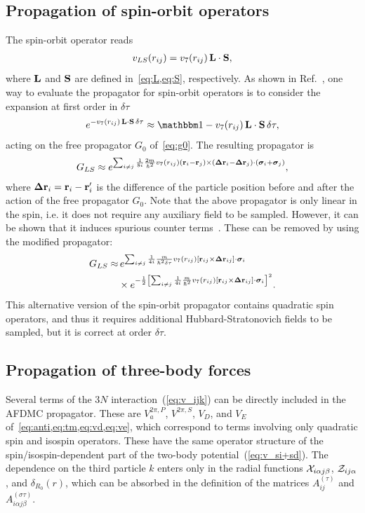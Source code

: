 \documentclass[aps,prc,twocolumn,superscriptaddress,floatfix]{revtex4-1}
\begin{document}
\subsection{Propagation of spin-orbit operators}
\label{sec:pls}
The spin-orbit operator reads
\begin{align}
v_{LS}(r_{ij})=v_7(r_{ij})\,\vb{L}\cdot\vb{S} ,
\end{align}
where $\vb{L}$ and $\vb{S}$ are defined in~\cref{eq:L,eq:S}, respectively.
As shown in Ref.~\cite{Pieper:1998}, one way to evaluate
the propagator for spin-orbit operators is to consider the expansion at first order in $\delta\tau$
\begin{align}
	e^{-v_7(r_{ij})\,\vb{L}\cdot\vb{S}\,\delta\tau}\approx\mathbbm1-v_7(r_{ij})\,\vb{L}\cdot\vb{S}\,\delta\tau ,
\end{align}
acting on the free propagator $G_0$ of~\cref{eq:g0}.
The resulting propagator is
\begin{align}
G_{LS}\approx e^{\sum_{i\ne j}\frac{1}{8i}\frac{2m}{\hbar^2}v_7(r_{ij})(\vb{r}_i-\vb{r}_j)
\times(\bm\Delta\vb{r}_i-\bm\Delta\vb{r}_j)\cdot(\bm\sigma_i+\bm\sigma_j)} ,
\end{align}
where $\bm\Delta\vb{r}_i=\vb{r}_i-\vb{r}_i'$ is the difference of the particle position before and after the
action of the free propagator $G_0$.
Note that the above propagator is only linear in the spin, i.e. it does not require any
auxiliary field to be sampled.
However, it can be shown that it induces spurious counter terms~\cite{Sarsa:2003}.
These can be removed by using the modified propagator:
\begin{align}
G_{LS}\approx &\,e^{\sum_{i\neq j}\frac{1}{4i}\frac{m}{\hbar^2\delta\tau}v_7(r_{ij})
[\vb{r}_{ij}\times\bm\Delta\vb{r}_{ij}]\cdot\bm\sigma_i}
\nonumber \\
&\times e^{-\frac{1}{2}\left[\sum_{i\neq j}\frac{1}{4i}\frac{m}{\hbar^2}v_7(r_{ij})
[\vb{r}_{ij}\times\bm\Delta\vb{r}_{ij}]\cdot\bm\sigma_i\right]^2} .
\end{align}
This alternative version of the spin-orbit propagator contains quadratic spin operators,
and thus it requires additional Hubbard-Stratonovich fields to be sampled, but it is 
correct at order $\delta\tau$.


\subsection{Propagation of three-body forces}
\label{sec:p3}
Several terms of the $3N$ interaction~(\ref{eq:v_ijk}) can be directly included in the AFDMC propagator. 
These are $V_a^{2\pi,P}$, $V^{2\pi,S}$, $V_D$, and $V_E$ of~\cref{eq:anti,eq:tm,eq:vd,eq:ve},
which correspond to terms involving only quadratic spin and isospin operators.
These have the same operator structure of the spin/isospin-dependent part of the
two-body potential~(\ref{eq:v_si+sd}). The dependence on the third particle $k$ enters only in the radial
functions ${\cal X}_{i\alpha j\beta}$, ${\cal Z}_{ij\alpha}$, and $\delta_{R_0}(r)$,
which can be absorbed in the definition of the
matrices $A^{(\tau)}_{ij}$ and $A^{(\sigma\tau)}_{i\alpha j\beta}$.
\end{document}
